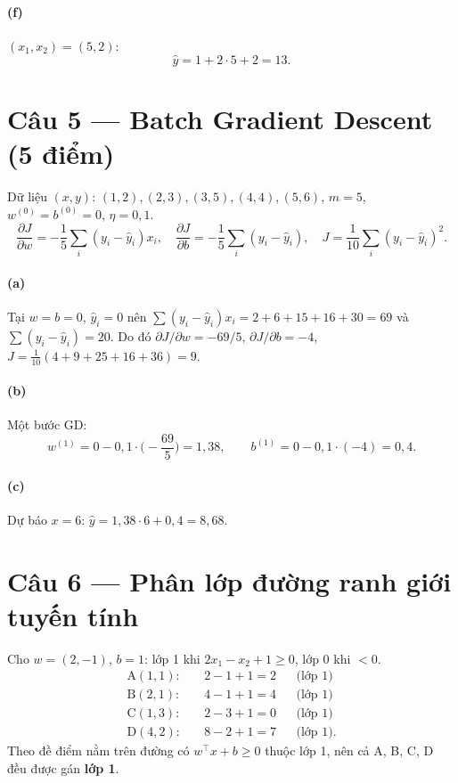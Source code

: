 \paragraph{(f)} $(x_1,x_2)=(5,2)$:
\[
\hat y=1+2\cdot 5+2=13.
\]

\section*{Câu 5 --- Batch Gradient Descent (5 điểm)}
Dữ liệu $(x,y)$: $(1,2),(2,3),(3,5),(4,4),(5,6)$, $m=5$, $w^{(0)}=b^{(0)}=0$, $\eta=0{,}1$.
\[
\frac{\partial J}{\partial w}=-\frac15\sum_i (y_i-\hat y_i)x_i,\quad
\frac{\partial J}{\partial b}=-\frac15\sum_i (y_i-\hat y_i),\quad
J=\frac{1}{10}\sum_i (y_i-\hat y_i)^2.
\]
\paragraph{(a)} Tại $w=b=0$, $\hat y_i=0$ nên $\sum (y_i-\hat y_i)x_i = 2+6+15+16+30=69$ và $\sum (y_i-\hat y_i)=20$.
Do đó $\partial J/\partial w=-69/5$, $\partial J/\partial b=-4$, $J=\frac{1}{10}(4+9+25+16+36)=9$.

\paragraph{(b)} Một bước GD:
\[
w^{(1)}=0-0{,}1\cdot\Big(-\frac{69}{5}\Big)=1{,}38,\qquad
b^{(1)}=0-0{,}1\cdot(-4)=0{,}4.
\]

\paragraph{(c)} Dự báo $x=6$: $\hat y=1{,}38\cdot 6+0{,}4=8{,}68$.

\section*{Câu 6 --- Phân lớp đường ranh giới tuyến tính}
Cho $w=(2,-1)$, $b=1$: lớp 1 khi $2x_1-x_2+1\ge 0$, lớp 0 khi $<0$.
\begin{align*}
\text{A}(1{,}1){:}\quad &2-1+1=2 &&\text{(lớp 1)} \\
\text{B}(2{,}1){:}\quad &4-1+1=4 &&\text{(lớp 1)} \\
\text{C}(1{,}3){:}\quad &2-3+1=0 &&\text{(lớp 1)} \\
\text{D}(4{,}2){:}\quad &8-2+1=7 &&\text{(lớp 1)}.
\end{align*}
Theo đề điểm nằm trên đường có $w^\top x+b\ge 0$ thuộc lớp 1, nên cả A, B, C, D đều được gán \textbf{lớp 1}.

